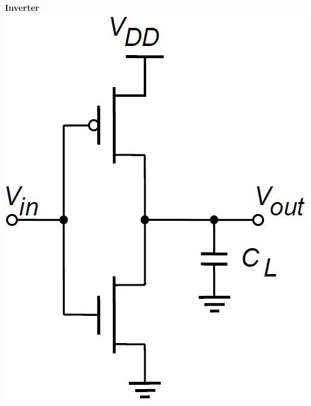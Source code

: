 \begin{minipage}[t]{0.32\columnwidth}
    \begin{center}
        \textbf{Inverter} \\
        \includegraphics[width=\columnwidth]{images/cmos_inverter.png}
    \end{center}
\end{minipage}
\hfill
